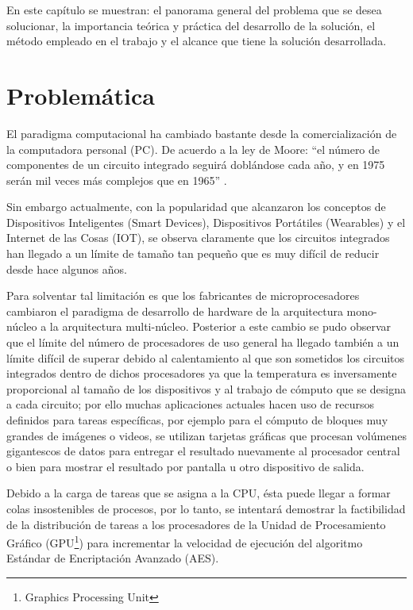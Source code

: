 \documentclass[../main.tex]{subfiles}
\begin{document}
\espacio

  En este capítulo se muestran: el panorama general del problema que se desea solucionar, la importancia teórica y práctica del desarrollo de la solución, el método empleado en el trabajo y el alcance que tiene la solución desarrollada.

  \section{Problemática}

  El paradigma computacional ha cambiado bastante desde la comercialización de la computadora personal (PC). De acuerdo a la ley de Moore: ``el número de componentes de un circuito integrado seguirá doblándose cada año, y en 1975 serán mil veces más complejos que en 1965'' \cite{article:ley_de_moore}.

  Sin embargo actualmente, con la popularidad que alcanzaron los conceptos de Dispositivos Inteligentes (Smart Devices), Dispositivos Portátiles (Wearables) y el Internet de las Cosas (IOT), se observa claramente que los circuitos integrados han llegado a un límite de tamaño tan pequeño que es muy difícil de reducir desde hace algunos años.

  Para solventar tal limitación es que los fabricantes de microprocesadores cambiaron el paradigma de desarrollo de hardware de la arquitectura mono-núcleo a la arquitectura multi-núcleo. Posterior a este cambio se pudo observar que el límite del número de procesadores de uso general ha llegado también a un límite difícil de superar debido al calentamiento al que son sometidos los circuitos integrados dentro de dichos procesadores ya que la temperatura es inversamente proporcional al tamaño de los dispositivos y al trabajo de cómputo que se designa a cada circuito; por ello muchas aplicaciones actuales hacen uso de recursos definidos para tareas específicas, por ejemplo para el cómputo de bloques muy grandes de imágenes o videos, se utilizan tarjetas gráficas que procesan volúmenes gigantescos de datos para entregar el resultado nuevamente al procesador central o bien para mostrar el resultado por pantalla u otro dispositivo de salida.

  Debido a la carga de tareas que se asigna a la CPU, ésta puede llegar a formar colas insostenibles de procesos, por lo tanto, se intentará demostrar la factibilidad de la distribución de tareas a los procesadores de la Unidad de Procesamiento Gráfico (GPU\footnote{Graphics Processing Unit}) para incrementar la velocidad de ejecución del algoritmo Estándar de Encriptación Avanzado (AES).
\end{document}
